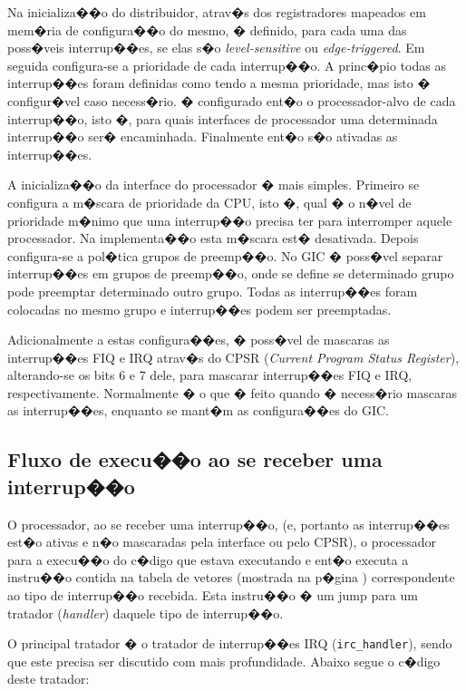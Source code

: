 \documentclass{ufscThesis/ufscThesis} %
\begin{document}
Na inicializa��o do distribuidor, atrav�s dos registradores mapeados em mem�ria de configura��o do mesmo, � definido, para cada uma das poss�veis interrup��es, se elas s�o \emph{level-sensitive} ou \emph{edge-triggered}.
Em seguida configura-se a prioridade de cada interrup��o. A princ�pio todas as interrup��es foram definidas como tendo a mesma prioridade, mas isto � configur�vel caso necess�rio.
� configurado ent�o o processador-alvo de cada interrup��o, isto �, para quais interfaces de processador uma determinada interrup��o ser� encaminhada. Finalmente ent�o s�o ativadas as interrup��es.

A inicializa��o da interface do processador � mais simples. Primeiro se configura a m�scara de prioridade da CPU, isto �, qual � o n�vel de prioridade m�nimo que uma interrup��o precisa ter para interromper aquele processador. Na implementa��o esta m�scara est� desativada. Depois configura-se a pol�tica grupos de preemp��o. No GIC � poss�vel separar interrup��es em grupos de preemp��o, onde se define se determinado grupo pode preemptar determinado outro grupo. Todas as interrup��es foram colocadas no mesmo grupo e interrup��es podem ser preemptadas.

Adicionalmente a estas configura��es, � poss�vel de mascaras as interrup��es FIQ e IRQ atrav�s do CPSR (\emph{Current Program Status Register}), alterando-se os bits 6 e 7 dele, para mascarar interrup��es FIQ e IRQ, respectivamente. Normalmente � o que � feito quando � necess�rio mascaras as interrup��es, enquanto se mant�m as configura��es do GIC.

\subsection{Fluxo de execu��o ao se receber uma interrup��o}

O processador, ao se receber uma interrup��o, (e, portanto as interrup��es est�o ativas e n�o mascaradas pela interface ou pelo CPSR), o processador para a execu��o do c�digo que estava executando e ent�o executa a instru��o contida na tabela de vetores (mostrada na p�gina \pageref) correspondente ao tipo de interrup��o recebida. Esta instru��o � um jump para um tratador (\emph{handler}) daquele tipo de interrup��o.

O principal tratador � o tratador de interrup��es IRQ (\verb+irc_handler+), sendo que este precisa ser discutido com mais profundidade. Abaixo segue o c�digo deste tratador:
\end{document}
